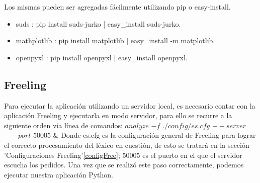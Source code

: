 \documentclass[12pt]{article}
\begin{document}
Los mismas pueden ser agregadas fácilmente utilizando pip o easy-install.
\begin{itemize}
  \item suds : pip install suds-jurko | easy\_install suds-jurko.
  \item mathplotlib : pip install matplotlib | easy\_install -m matplotlib.
  \item openpyxl : pip install openpyxl | easy\_install openpyxl.
\end{itemize}


\subsection{Freeling}\label{free}
Para ejecutar la aplicación utilizando un servidor local, es necesario contar con la aplicación Freeling y ejecutarla en modo servidor, para ello se recurre a la siguiente orden vía línea de comandos:
$analyze$ $-f$ $./config/es.cfg$ $--server$ $--port$ $50005$ $\&$
Donde es.cfg es la configuración general de Freeling para lograr el correcto procesamiento del léxico en cuestión, de esto se tratará en la sección 'Configuraciones Freeling'\ref{configFree}; 50005 es el puerto en el que el servidor escucha los pedidos.
Una vez que se realizó este paso correctamente, podemos ejecutar nuestra aplicación Python. 
\end{document}
